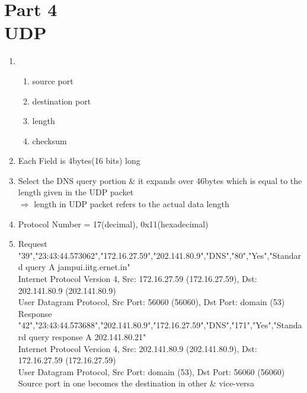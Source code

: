 \documentclass[a4,11pt]{article}
\begin{document}
\section{Part 4\\
	  UDP}
  \begin{enumerate}
   \item 
    \begin{enumerate}
      \item source port
      \item destination port
      \item length
      \item checksum
    \end{enumerate}

  \item Each Field is 4bytes(16 bits) long

  \item Select the DNS query portion \& it expands over 46bytes which is equal to the length given in the UDP packet \\
      $\Rightarrow$ length in UDP packet refers to the actual data length

  \item Protocol Number =  17(decimal), 0x11(hexadecimal)

  \item 
  Request		"39","23:43:44.573062","172.16.27.59","202.141.80.9","DNS","80","Yes","Standard query A jampui.iitg.ernet.in" \\
		  Internet Protocol Version 4, Src: 172.16.27.59 (172.16.27.59), Dst: 202.141.80.9 (202.141.80.9) \\
		  User Datagram Protocol, Src Port: 56060 (56060), Dst Port: domain (53)		\\

  Response	"42","23:43:44.573688","202.141.80.9","172.16.27.59","DNS","171","Yes","Standard query response A 202.141.80.21" \\
		  Internet Protocol Version 4, Src: 202.141.80.9 (202.141.80.9), Dst: 172.16.27.59 (172.16.27.59) \\
		  User Datagram Protocol, Src Port: domain (53), Dst Port: 56060 (56060) \\

  Source port in one becomes the destination in other \& vice-versa
  \end{enumerate}

	  
\end{document}
